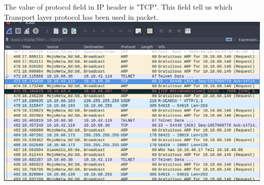 \documentclass[14pt]{extarticle}
\begin{document}
    The value of protocol field in IP header is "TCP". This field tell us which Transport layer protocol has been used in packet.\\[10pt]
    
    \includegraphics[scale=0.45]{6a}

    \vspace{1cm}
\end{document}
